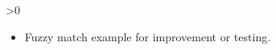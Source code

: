 \ifnum\printdraft>0
	\begin{itemize}
		\item Fuzzy match example for improvement or testing.
	\end{itemize}
\fi